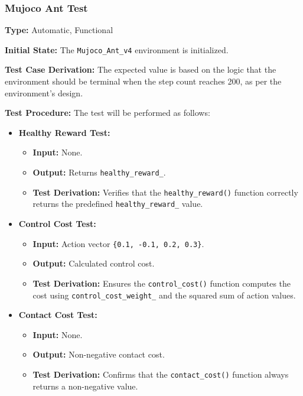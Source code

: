 \documentclass[12pt, titlepage]{article}
\begin{document}
\subsubsection{Mujoco Ant Test\\}

\textbf{Type:} Automatic, Functional

\textbf{Initial State:} The \texttt{Mujoco\_Ant\_v4} environment is initialized.

\textbf{Test Case Derivation:} The expected value is based on the logic that the environment should be terminal when the step count reaches 200, as per the environment's design.

\textbf{Test Procedure:} The test will be performed as follows:
\begin{itemize}
    \item \textbf{Healthy Reward Test:}
    \begin{itemize}
        \item \textbf{Input:} None.
        \item \textbf{Output:} Returns \texttt{healthy\_reward\_}.
        \item \textbf{Test Derivation:} Verifies that the \texttt{healthy\_reward()} function correctly returns the predefined \texttt{healthy\_reward\_} value.
    \end{itemize}

    \item \textbf{Control Cost Test:}
    \begin{itemize}
        \item \textbf{Input:} Action vector \texttt{\{0.1, -0.1, 0.2, 0.3\}}.
        \item \textbf{Output:} Calculated control cost.
        \item \textbf{Test Derivation:} Ensures the \texttt{control\_cost()} function computes the cost using \texttt{control\_cost\_weight\_} and the squared sum of action values.
    \end{itemize}

    \item \textbf{Contact Cost Test:}
    \begin{itemize}
        \item \textbf{Input:} None.
        \item \textbf{Output:} Non-negative contact cost.
        \item \textbf{Test Derivation:} Confirms that the \texttt{contact\_cost()} function always returns a non-negative value.
    \end{itemize}


\end{itemize}
\end{document}
